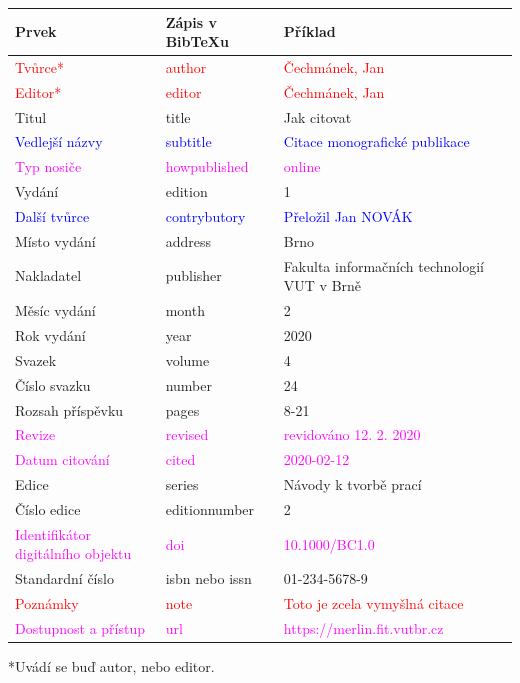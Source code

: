 \begin{tabularx}{\linewidth}{X X X}
    Prvek & Zápis v BibTeXu & Příklad\\\hline
    \textcolor{red}{Tvůrce*} & \textcolor{red}{author} & \textcolor{red}{Čechmánek, Jan}\\
    \textcolor{red}{Editor*} & \textcolor{red}{editor} & \textcolor{red}{Čechmánek, Jan}\\
    Titul & title & Jak citovat\\
    \textcolor{blue}{Vedlejší názvy} & \textcolor{blue}{subtitle} & \textcolor{blue}{Citace monografické publikace}\\
    \textcolor{magenta}{Typ nosiče} & \textcolor{magenta}{howpublished} & \textcolor{magenta}{online}\\
    Vydání & edition & 1\\
    \textcolor{blue}{Další tvůrce} & \textcolor{blue}{contrybutory} & \textcolor{blue}{Přeložil Jan NOVÁK}\\
    Místo vydání & address & Brno\\
    Nakladatel & publisher & Fakulta informačních technologií VUT v Brně\\
    Měsíc vydání & month & 2\\
    Rok vydání & year & 2020\\
    Svazek & volume & 4\\
    Číslo svazku & number & 24\\
    Rozsah příspěvku & pages & 8-21\\
    \textcolor{magenta}{Revize} & \textcolor{magenta}{revised} & \textcolor{magenta}{revidováno 12. 2. 2020}\\
    \textcolor{magenta}{Datum citování} & \textcolor{magenta}{cited} & \textcolor{magenta}{2020-02-12}\\
    Edice & series & Návody k tvorbě prací\\
    Číslo edice & editionnumber & 2\\
    \textcolor{magenta}{Identifikátor digitálního objektu} & \textcolor{magenta}{doi} & \textcolor{magenta}{10.1000/BC1.0}\\
    Standardní číslo & isbn nebo issn & 01-234-5678-9\\
    \textcolor{red}{Poznámky} & \textcolor{red}{note} & \textcolor{red}{Toto je zcela vymyšlná citace}\\
    \textcolor{magenta}{Dostupnost a přístup} & \textcolor{magenta}{url} & \textcolor{magenta}{https://merlin.fit.vutbr.cz}
\end{tabularx}
*Uvádí se buď autor, nebo editor.

